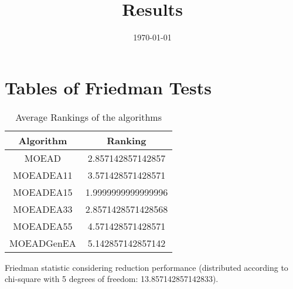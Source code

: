\documentclass{article}
\title{Results}
\author{}
\date{\today}
\begin{document}
\oddsidemargin 0in \topmargin 0in\maketitle
\section{Tables of Friedman Tests}
\begin{table}[!htp]
\centering
\caption{Average Rankings of the algorithms
}\begin{tabular}{c|c}
Algorithm&Ranking\\
\hline
MOEAD&2.857142857142857\\
MOEADEA11&3.571428571428571\\
MOEADEA15&1.9999999999999996\\
MOEADEA33&2.8571428571428568\\
MOEADEA55&4.571428571428571\\
MOEADGenEA&5.142857142857142\\
\end{tabular}
\end{table}


Friedman statistic considering reduction performance (distributed according to chi-square with 5 degrees of freedom: 13.857142857142833).
\end{document}
